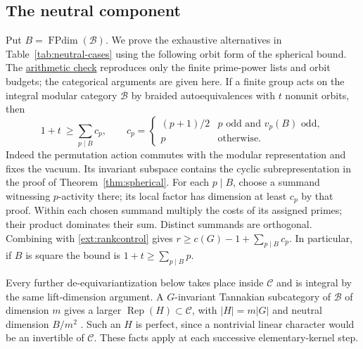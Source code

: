 \documentclass[11pt]{amsart}
\numberwithin{equation}{section}
\theoremstyle{definition}
\theoremstyle{plain}
\DeclareMathOperator{\FPdim}{FPdim}
\newcommand{\C}{\mathcal C}
\newcommand{\supfile}[2]{\href{run:rank-bound-supplement/#1}{#2}}
\begin{document}
\subsection{The neutral component}\label{ext:neutral}
Put $B=\FPdim(\mathcal B)$. We prove the exhaustive alternatives in
Table~\ref{tab:neutral-cases} using the following orbit form of the
spherical bound. The
\supfile{arithmetic/perfect_counts.py}{arithmetic check} reproduces only
the finite prime-power lists and orbit budgets; the categorical
arguments are given here.
If a finite group acts on the integral modular category $\mathcal B$ by braided autoequivalences
with $t$ nonunit orbits, then
\begin{equation}\label{ext:primeorbits}
 1+t\ \ge\sum_{p\mid B} c_p,\qquad c_p=
 \begin{cases}(p+1)/2& p\text{ odd and }v_p(B)\text{ odd},\\
 p&\text{otherwise}.\end{cases}
\end{equation}
Indeed the permutation action commutes with the modular representation
and fixes the vacuum. Its invariant subspace contains the cyclic
subrepresentation in the proof of Theorem~\ref{thm:spherical}.
For each $p\mid B$, choose a summand witnessing $p$-activity there;
its local factor has dimension at least $c_p$ by that proof.
Within each chosen summand multiply the costs of its assigned primes;
their product dominates their sum. Distinct summands are orthogonal.
Combining with \eqref{ext:rankcontrol} gives $r\ge c(G)-1+\sum_{p\mid B}c_p$. In particular, if $B$ is square the bound is $1+t\ge\sum_{p\mid B}p$.

Every further de-equivariantization below takes place inside $\C$ and
is integral by the same lift-dimension argument. A $G$-invariant
Tannakian subcategory of $\mathcal B$ of dimension $m$ gives a larger
$\operatorname{Rep}(H)\subset\C$, with $|H|=m|G|$ and neutral
dimension $B/m^2$ \cite[Corollary~4.31(iii)]{DGNO}. Such an $H$ is
perfect, since a nontrivial linear character would be an invertible
of $\C$. These facts apply at each successive elementary-kernel step.
\end{document}
